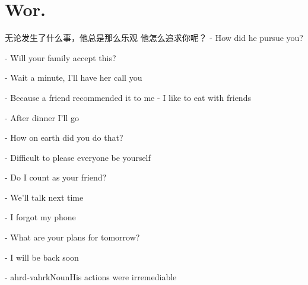 \documentclass[14pt,a4paper,twoside]{article} %
\newcommand{\centry}[2]{#1 - #2}
\begin{document}
    \section*{Wor.}

\begin{multicols}{2}

    无论发生了什么事，他总是那么乐观
    他怎么追求你呢？ - How did he pursue you?

    \centry{}{Will your family accept this?}

    \centry{}{Wait a minute, I'll have her call you}

    \centry{}{Because a friend recommended it to me}
    \centry{}{I like to eat with friends}

    \centry{}{After dinner I'll go}

    \centry{}{How on earth did you do that?}

    \centry{}{Difficult to please everyone be yourself}

    \centry{}{Do I count as your friend?}

    \centry{}{We'll talk next time}


    \centry{}{I forgot my phone}


    \centry{}{What are your plans for tomorrow?}

    \centry{}{I will be back soon}

    \centry{}{ahrd-vahrk}{Noun}{His actions were irremediable}

\end{multicols}
\end{document}

